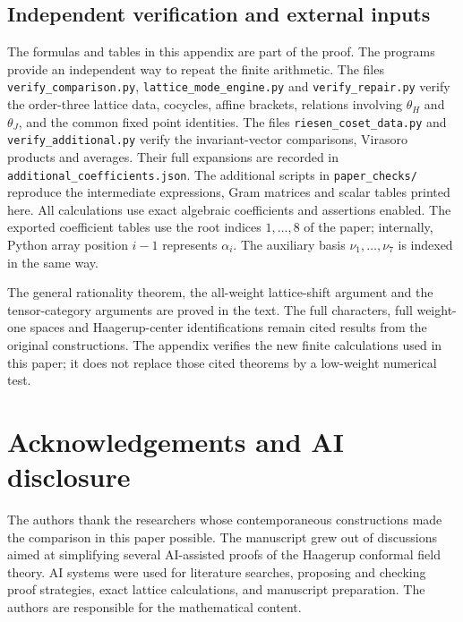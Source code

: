 \documentclass[11pt,reqno]{amsart}
\theoremstyle{definition}\newtheorem{definition}[theorem]{Definition}
\theoremstyle{remark}\newtheorem{remark}[theorem]{Remark}
\numberwithin{equation}{section}
\begin{document}
\subsection{Independent verification and external inputs}\label{app:programs}
The formulas and tables in this appendix are part of the proof. The programs provide an independent way to repeat the finite arithmetic. The files \nolinkurl{verify_comparison.py}, \nolinkurl{lattice_mode_engine.py} and \nolinkurl{verify_repair.py} verify the order-three lattice data, cocycles, affine brackets, relations involving $\theta_H$ and $\theta_J$, and the common fixed point identities. The files \nolinkurl{riesen_coset_data.py} and \nolinkurl{verify_additional.py} verify the invariant-vector comparisons, Virasoro products and averages. Their full expansions are recorded in \nolinkurl{additional_coefficients.json}. The additional scripts in \nolinkurl{paper_checks/} reproduce the intermediate expressions, Gram matrices and scalar tables printed here. All calculations use exact algebraic coefficients and assertions enabled. The exported coefficient tables use the root indices $1,\ldots,8$ of the paper; internally, Python array position $i-1$ represents $\alpha_i$. The auxiliary basis $\nu_1,\ldots,\nu_7$ is indexed in the same way.

The general rationality theorem, the all-weight lattice-shift argument and the tensor-category arguments are proved in the text. The full characters, full weight-one spaces and Haagerup-center identifications remain cited results from the original constructions. The appendix verifies the new finite calculations used in this paper; it does not replace those cited theorems by a low-weight numerical test.


\section*{Acknowledgements and AI disclosure}
The authors thank the researchers whose contemporaneous constructions made the comparison in this paper possible. The manuscript grew out of discussions aimed at simplifying several AI-assisted proofs of the Haagerup conformal field theory. AI systems were used for literature searches, proposing and checking proof strategies, exact lattice calculations, and manuscript preparation. The authors are responsible for the mathematical content.
\end{document}
